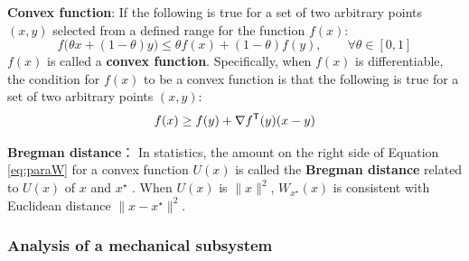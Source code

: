 \documentclass[graybox, envcountchap]{svmult}
\begin{document}
\begin{COLUMN}
\noindent \textbf{Convex function}:
If the following is true for a set of two arbitrary points $(x,y)$ selected from a defined range for the function $f(x)$:
\[
f\bigl(
\theta x + (1-\theta) y
\bigr)
\leq \theta f(x) + (1- \theta) f(y)
,\qquad
\forall \theta \in [0,1]
\]
$f(x)$ is called a \textbf{convex function}. Specifically, when $f(x)$ is differentiable, the condition for $f(x)$ to be a convex function is that the following is true for a set of two arbitrary points $(x,y)$:
\[
f(x) \geq f(y) + \nabla f^{\sf T}(y)(x-y)
\]

\smallskip
\noindent \textbf{Bregman distance}：
In statistics, the amount on the right side of Equation \ref{eq:paraW} for a convex function $U(x)$ is called the \textbf{Bregman distance} related to $U(x)$ of $x$ and $x^{\star}$ \cite{bregman1967relaxation}.
When $U(x)$ is $\|x\|^2$, $W_{x^{\star}}(x)$ is consistent with Euclidean distance $\|x-x^{\star}\|^2$.
\end{COLUMN}



\smallskip
\subsubsection{Analysis of a mechanical subsystem}
\end{document}

